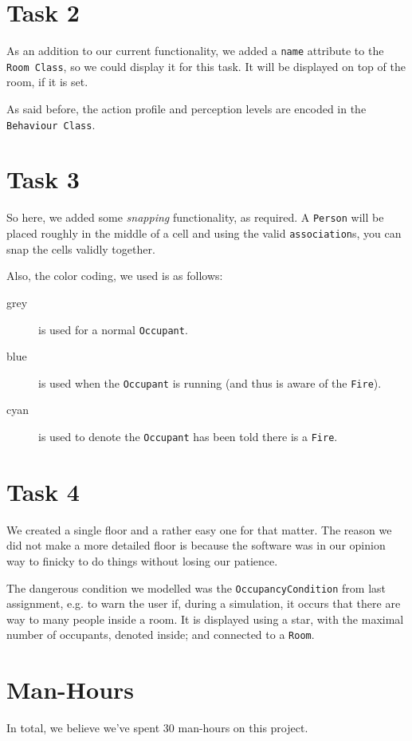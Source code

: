 \documentclass[11pt]{article}
\begin{document}
\section{Task 2}
As an addition to our current functionality, we added a \texttt{name} attribute to the \texttt{Room Class}, so we could display it for this task. It will be displayed on top of the room, if it is set.

As said before, the action profile and perception levels are encoded in the \texttt{Behaviour Class}.

\section{Task 3}
\label{sec:task3}
So here, we added some \textit{snapping} functionality, as required. A \texttt{Person} will be placed roughly in the middle of a cell and using the valid \texttt{association}s, you can snap the cells validly together.

Also, the color coding, we used is as follows:
\begin{description}
	\item[grey] is used for a normal \texttt{Occupant}.
	\item[blue] is used when the \texttt{Occupant} is running (and thus is aware of the \texttt{Fire}).
	\item[cyan] is used to denote the \texttt{Occupant} has been told there is a \texttt{Fire}.
\end{description}

\section{Task 4}
We created a single floor and a rather easy one for that matter. The reason we did not make a more detailed floor is because the software was in our opinion way to finicky to do things without losing our patience.

The dangerous condition we modelled was the \texttt{OccupancyCondition} from last assignment, e.g. to warn the user if, during a simulation, it occurs that there are way to many people inside a room. It is displayed using a star, with the maximal number of occupants, denoted inside; and connected to a \texttt{Room}.

\section{Man-Hours}
In total, we believe we've spent 30 man-hours on this project.
\end{document}
